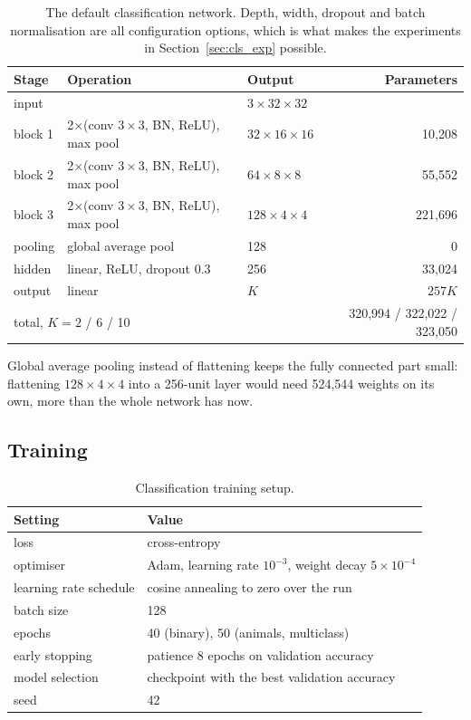 \documentclass[11pt,a4paper]{article}
\begin{document}
\begin{table}[H]
\centering\small
\begin{tabular}{lllr}
\toprule
\textbf{Stage} & \textbf{Operation} & \textbf{Output} & \textbf{Parameters} \\
\midrule
input & & $3\times32\times32$ & \\
block 1 & 2$\times$(conv $3\times3$, BN, ReLU), max pool & $32\times16\times16$ & 10{,}208 \\
block 2 & 2$\times$(conv $3\times3$, BN, ReLU), max pool & $64\times8\times8$ & 55{,}552 \\
block 3 & 2$\times$(conv $3\times3$, BN, ReLU), max pool & $128\times4\times4$ & 221{,}696 \\
pooling & global average pool & 128 & 0 \\
hidden & linear, ReLU, dropout 0.3 & 256 & 33{,}024 \\
output & linear & $K$ & $257K$ \\
\midrule
\multicolumn{3}{l}{total, $K=2$ / 6 / 10} & 320{,}994 / 322{,}022 / 323{,}050 \\
\bottomrule
\end{tabular}
\caption{The default classification network. Depth, width, dropout and batch
normalisation are all configuration options, which is what makes the experiments
in Section~\ref{sec:cls_exp} possible.}
\label{tab:cls_arch}
\end{table}

Global average pooling instead of flattening keeps the fully connected part
small: flattening $128\times4\times4$ into a 256-unit layer would need 524{,}544
weights on its own, more than the whole network has now.

\subsection{Training}

\begin{table}[H]
\centering\small
\begin{tabular}{ll}
\toprule
\textbf{Setting} & \textbf{Value} \\
\midrule
loss & cross-entropy \\
optimiser & Adam, learning rate $10^{-3}$, weight decay $5\times10^{-4}$ \\
learning rate schedule & cosine annealing to zero over the run \\
batch size & 128 \\
epochs & 40 (binary), 50 (animals, multiclass) \\
early stopping & patience 8 epochs on validation accuracy \\
model selection & checkpoint with the best validation accuracy \\
seed & 42 \\
\bottomrule
\end{tabular}
\caption{Classification training setup.}
\end{table}
\end{document}
